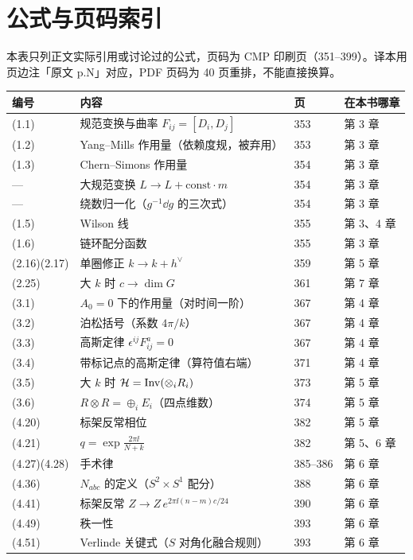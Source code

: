 \section{公式与页码索引}
\label{app:equations}

本表只列正文实际引用或讨论过的公式，页码为 CMP 印刷页（351–399）。译本用页边注「原文 p.N」对应，PDF 页码为 40 页重排，不能直接换算。

\begin{center}
\small
\begin{longtable}{@{}p{2.1cm}p{6.0cm}p{1.4cm}p{4.6cm}@{}}
\toprule
编号 & 内容 & 页 & 在本书哪章 \\
\midrule
\endhead
(1.1) & 规范变换与曲率 $F_{ij}=[D_i,D_j]$ & 353 & 第 3 章 \\
(1.2) & Yang--Mills 作用量（依赖度规，被弃用） & 353 & 第 3 章 \\
(1.3) & Chern--Simons 作用量 & 354 & 第 3 章 \\
--- & 大规范变换 $L\to L+\mathrm{const}\cdot m$ & 354 & 第 3 章 \\
--- & 绕数归一化（$g^{-1}\dd g$ 的三次式） & 354 & 第 3 章 \\
(1.5) & Wilson 线 & 355 & 第 3、4 章 \\
(1.6) & 链环配分函数 & 355 & 第 3 章 \\
(2.16)(2.17) & 单圈修正 $k\to k+h^\vee$ & 359 & 第 5 章 \\
(2.25) & 大 $k$ 时 $c\to\dim G$ & 361 & 第 7 章 \\
(3.1) & $A_0=0$ 下的作用量（对时间一阶） & 367 & 第 4 章 \\
(3.2) & 泊松括号（系数 $4\pi/k$） & 367 & 第 4 章 \\
(3.3) & 高斯定律 $\epsilon^{ij}F^a_{ij}=0$ & 367 & 第 4 章 \\
(3.4) & 带标记点的高斯定律（算符值右端） & 371 & 第 4 章 \\
(3.5) & 大 $k$ 时 $\mathcal{H}=\mathrm{Inv}(\otimes_i R_i)$ & 373 & 第 5 章 \\
(3.6) & $R\otimes R=\oplus_i E_i$（四点维数） & 374 & 第 5 章 \\
(4.20) & 标架反常相位 & 382 & 第 5 章 \\
(4.21) & $q=\exp\frac{2\pi\ii}{N+k}$ & 382 & 第 5、6 章 \\
(4.27)(4.28) & 手术律 & 385--386 & 第 6 章 \\
(4.36) & $N_{abc}$ 的定义（$S^2\times S^1$ 配分） & 388 & 第 6 章 \\
(4.41) & 标架反常 $Z\to Z\,e^{2\pi\ii(n-m)c/24}$ & 390 & 第 6 章 \\
(4.49) & 秩一性 & 393 & 第 6 章 \\
(4.51) & Verlinde 关键式（$S$ 对角化融合规则） & 393 & 第 6 章 \\
\bottomrule
\end{longtable}
\end{center}

